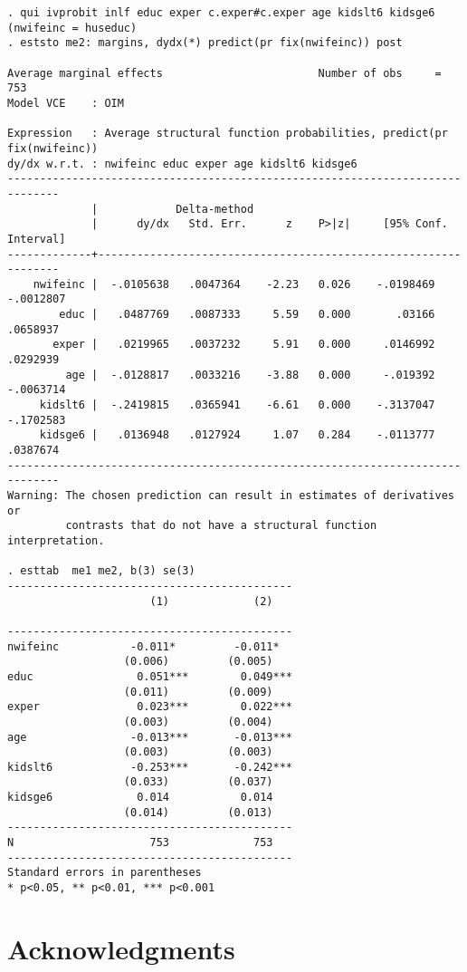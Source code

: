 \begin{verbatim}
. qui ivprobit inlf educ exper c.exper#c.exper age kidslt6 kidsge6 (nwifeinc = huseduc)
. eststo me2: margins, dydx(*) predict(pr fix(nwifeinc)) post

Average marginal effects                        Number of obs     =        753
Model VCE    : OIM

Expression   : Average structural function probabilities, predict(pr fix(nwifeinc))
dy/dx w.r.t. : nwifeinc educ exper age kidslt6 kidsge6
------------------------------------------------------------------------------
             |            Delta-method
             |      dy/dx   Std. Err.      z    P>|z|     [95% Conf. Interval]
-------------+----------------------------------------------------------------
    nwifeinc |  -.0105638   .0047364    -2.23   0.026    -.0198469   -.0012807
        educ |   .0487769   .0087333     5.59   0.000       .03166    .0658937
       exper |   .0219965   .0037232     5.91   0.000     .0146992    .0292939
         age |  -.0128817   .0033216    -3.88   0.000     -.019392   -.0063714
     kidslt6 |  -.2419815   .0365941    -6.61   0.000    -.3137047   -.1702583
     kidsge6 |   .0136948   .0127924     1.07   0.284    -.0113777    .0387674
------------------------------------------------------------------------------
Warning: The chosen prediction can result in estimates of derivatives or
         contrasts that do not have a structural function interpretation.

. esttab  me1 me2, b(3) se(3)
--------------------------------------------
                      (1)             (2)   
                                            
--------------------------------------------
nwifeinc           -0.011*         -0.011*  
                  (0.006)         (0.005)   
educ                0.051***        0.049***
                  (0.011)         (0.009)   
exper               0.023***        0.022***
                  (0.003)         (0.004)   
age                -0.013***       -0.013***
                  (0.003)         (0.003)   
kidslt6            -0.253***       -0.242***
                  (0.033)         (0.037)   
kidsge6             0.014           0.014   
                  (0.014)         (0.013)   
--------------------------------------------
N                     753             753   
--------------------------------------------
Standard errors in parentheses
* p<0.05, ** p<0.01, *** p<0.001
\end{verbatim}

\hypertarget{acknowledgments}{%
\section{Acknowledgments}\label{acknowledgments}}

